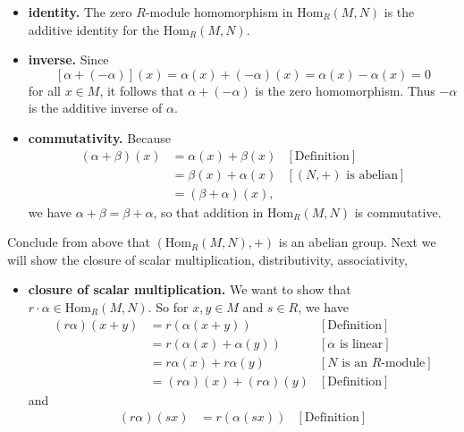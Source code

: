 \documentclass[9pt]{article}
\begin{document}
\begin{enumerate}
\begin{itemize}
         \item \textbf{identity.} The zero $R$-module homomorphism in
               $\text{Hom}_R(M, N)$ is the additive identity for the
               $\text{Hom}_R(M, N)$.
         \item \textbf{inverse.} Since
               $$[\alpha + (-\alpha)](x) = \alpha(x) + (-\alpha)(x) =
                 \alpha(x) - \alpha(x) = 0$$
               for all $x \in M$, it follows that $\alpha + (-\alpha)$ is the
               zero homomorphism. Thus $-\alpha$ is the additive inverse of
               $\alpha$.
         \item \textbf{commutativity.} Because
               \begin{align*}
                  (\alpha+\beta)(x) &= \alpha(x) + \beta(x)
                     &[\text{Definition}] \\
                     &= \beta(x) + \alpha(x) &[(N, +) \text{ is abelian}] \\
                     &= (\beta+\alpha)(x),
               \end{align*}
               we have $\alpha + \beta = \beta + \alpha$, so that addition in
               $\text{Hom}_R(M, N)$ is commutative.
      \end{itemize}
      Conclude from above that $(\text{Hom}_R(M, N), +)$ is an abelian group.
      Next we will show the closure of scalar multiplication, distributivity,
      associativity,
      \begin{itemize}
         \item \textbf{closure of scalar multiplication.} We want to show that
               $r \cdot \alpha \in \text{Hom}_R(M, N)$. So for $x, y \in M$ and
               $s \in R$, we
               have
               \begin{align*}
                  (r\alpha)(x + y) &= r (\alpha(x + y)) &[\text{Definition}] \\
                     &= r(\alpha(x) + \alpha(y)) &[\alpha \text{ is linear}] \\
                     &= r\alpha(x) + r\alpha(y)
                        &[N \text{ is an } R\text{-module}] \\
                     &= (r\alpha)(x) + (r\alpha)(y) &[\text{Definition}]
               \end{align*}
               and
               \begin{align*}
                  (r\alpha)(sx) &= r (\alpha(sx)) &[\text{Definition}] \\

\end{align*}
\end{itemize}
\end{enumerate}
\end{document}
